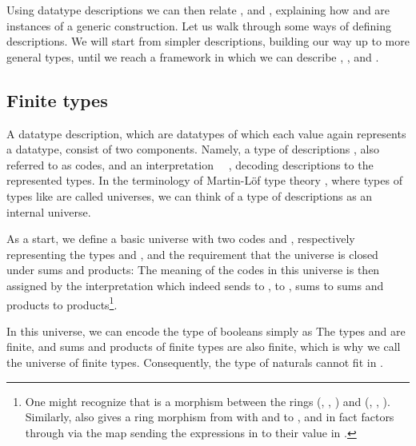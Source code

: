 Using datatype descriptions we can then relate \bN{},  and , explaining how  and  are instances of a generic construction. Let us walk through some ways of defining descriptions. We will start from simpler descriptions, building our way up to more general types, until we reach a framework in which we can describe \bN{}, ,  and . 


\subsection{Finite types}\label{ssec:background-fin}
A datatype description, which are datatypes of which each value again represents a datatype, consist of two components. Namely, a type of descriptions , also referred to as codes, and an interpretation \ \ , decoding descriptions to the represented types. In the terminology of Martin-L{\"{o}}f type theory\cite{levitation} , where types of types like  are called universes, we can think of a type of descriptions as an internal universe.

As a start, we define a basic universe with two codes  and , respectively representing the types  and , and the requirement that the universe is closed under sums and products:
The meaning of the codes in this universe is then assigned by the interpretation
which indeed sends  to ,  to , sums to sums and products to products\footnote{One might recognize that  is a morphism between the rings (, , ) and (, , ). Similarly,  also gives a ring morphism from \bN{} with \AF{+} and  to , and in fact  factors through  via the map sending the expressions in  to their value in \bN{}.}.

In this universe, we can encode the type of booleans simply as 
The types  and  are finite, and sums and products of finite types are also finite, which is why we call  the universe of finite types. Consequently, the type of naturals \bN{} cannot fit in .

